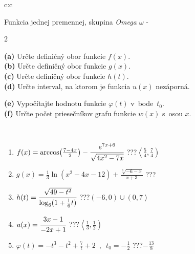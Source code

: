 \documentclass[10pt]{report}
\begin{document}
\begin{tabular}{c:c}
\begin{minipage}[c][104.5mm][t]{0.5\linewidth}
\begin{center}
\vspace{7mm}
{\huge Funkcia jednej premennej, skupina \textit{Omega $\omega$} -}\\[5mm]
\begin{minipage}{0.95\linewidth}
\begin{center}
{\small \begin{multicols}{2} \raggedright
\textbf{(a)} Určte definičný obor funkcie \(f(x)\). \\[1mm]
\textbf{(b)} Určte definičný obor funkcie \(g(x)\). \\[1mm]
\textbf{(c)} Určte definičný obor funkcie \(h(t)\). \\[1mm]
\textbf{(d)} Určte interval, na ktorom je funkcia \(u(x)\) nezáporná. \par \columnbreak
\textbf{(e)} Vypočítajte hodnotu funkcie \(\varphi(t)\) v~bode~\(t_0\). \\[1mm]
\textbf{(f)} Určte počet priesečníkov grafu funkcie \(w(x)\) s~osou \(x\). \\[1mm]
\end{multicols}
}
\end{center}
\end{minipage}
\\[4mm]
\begin{minipage}{0.79\linewidth}
\begin{center}
\begin{varwidth}{\linewidth}
\begin{enumerate}
\small
\item $f(x) = \arccos\!\left( \frac{7-4x}{2} \right) - \cfrac{e^{7x+6}}{\sqrt{4x^2-7x}}$\quad \dotfill\; ???\;\dotfill \quad $\left\langle\frac{5}{4} , \frac{7}{4}\right)$
\item $g(x) = \frac{1}{3} \ln{\!(x^2-4x-12)}+\frac{\sqrt[3]{-6-x}}{x+3}$\quad \dotfill\; ???\;\dotfill {}
\item $h(t) = \cfrac{\sqrt{49-t^2}}{\log_6(1+\frac{1}{6}t)}$\quad \dotfill\; ???\;\dotfill \quad $\left(-6 , 0\right)\cup\left(0 , 7\right\rangle$
\item $u(x) = \cfrac{3x-1}{-2x+1}$\quad \dotfill\; ???\;\dotfill \quad $\left\langle\frac{1}{3} , \frac{1}{2}\right)$
\item $\varphi(t) = -t^3-t^2+\frac{7}{t}+2 \enspace , \enspace t_0=-\frac{1}{2}$\quad \dotfill\; ???\;\dotfill \quad $-\frac{13}{8}$

\end{enumerate}
\end{varwidth}
\end{center}
\end{minipage}
\end{center}
\end{minipage}
\end{tabular}
\end{document}
